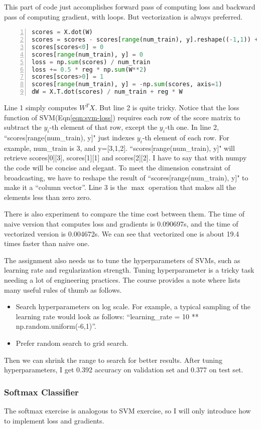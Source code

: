 \documentclass{article} %
\begin{document}
This part of code just accomplishes forward pass of computing loss and backward pass of computing gradient, with loops. But vectorization is always preferred.
\begin{lstlisting}[language=python,numbers=left]
scores = X.dot(W)
scores = scores - scores[range(num_train), y].reshape((-1,1)) + 1
scores[scores<0] = 0
scores[range(num_train), y] = 0
loss = np.sum(scores) / num_train
loss += 0.5 * reg * np.sum(W**2)
scores[scores>0] = 1
scores[range(num_train), y] = -np.sum(scores, axis=1)
dW = X.T.dot(scores) / num_train + reg * W
\end{lstlisting}
Line 1 simply computes $W^TX$. But line 2 is quite tricky. Notice that the loss function of SVM(Eqn\ref{eqn:svm-loss}) requires each row of the score matrix to subtract the $y_i$-th element of that row, except the $y_i$-th one. In line 2, ``scores[range(num\_train), y]" just indexes $y_i$-th element of each row. For example, num\_train is 3, and y=[3,1,2]. ``scores[range(num\_train), y]" will retrieve scores[0][3], scores[1][1] and scores[2][2]. I have to say that with numpy the code will be concise and elegant. To meet the dimension constraint of broadcasting, we have to reshape the result of ``scores[range(num\_train), y]" to make it a ``column vector''. Line 3 is the $\max$ operation that makes all the elements less than zero zero.

There is also experiment to compare the time cost between them. The time of naive version that computes loss and gradients is 0.090697s, and the time of vectorized version is 0.004672s. We can see that vectorized one is about 19.4 times faster than naive one.

The assignment also needs us to tune the hyperparameters of SVMs, such as learning rate and regularization strength. Tuning hyperparameter is a tricky task needing a lot of engineering practices. The course provides a note where lists many useful rules of thumb as follows.
\begin{itemize}
    \item Search hyperparameters on log scale. For example, a typical sampling of the learning rate would look as follows: ``learning\_rate = 10 ** np.random.uniform(-6,1)''.
    \item Prefer random search to grid search.
\end{itemize}
Then we can shrink the range to search for better results. After tuning hyperparameters, I get 0.392 accuracy on validation set and 0.377 on test set.

\subsubsection{Softmax Classifier}
The softmax exercise is analogous to SVM exercise, so I will only introduce how to implement loss and gradients.
\end{document}
